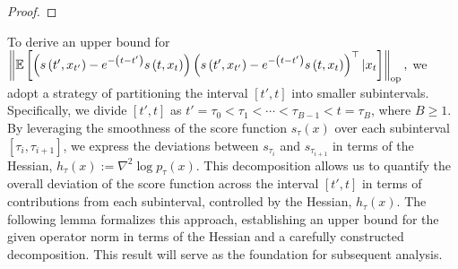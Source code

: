 \begin{proof}


    
\end{proof}

To derive an upper bound for  $\left\lVert\mathbb{E}\left[\left(s\left(t', x_{t'}\right) - e^{-\left(t-t'\right)}s\left(t, x_t\right)\right)\left(s\left(t', x_{t'}\right) - e^{-\left(t-t'\right)}s\left(t, x_t\right)\right)^{\top}|x_{t}\right]\right\rVert_{\textup{op}},$
we adopt a strategy of partitioning the interval \([t', t]\) into smaller subintervals. Specifically, we divide \([t', t]\) as \(t' = \tau_0 < \tau_1 < \cdots < \tau_{B-1} < t = \tau_B\), where \(B \geq 1\). By leveraging the smoothness of the score function \(s_{\tau}(x)\) over each subinterval \([\tau_i, \tau_{i+1}]\), we express the deviations between \(s_{\tau_i}\) and \(s_{\tau_{i+1}}\) in terms of the Hessian, \(h_\tau(x) := \nabla^2 \log p_\tau(x)\). This decomposition allows us to quantify the overall deviation of the score function across the interval \([t', t]\) in terms of contributions from each subinterval, controlled by the Hessian, \(h_\tau(x)\). The following lemma formalizes this approach, establishing an upper bound for the given operator norm in terms of the Hessian and a carefully constructed decomposition. This result will serve as the foundation for subsequent analysis.


